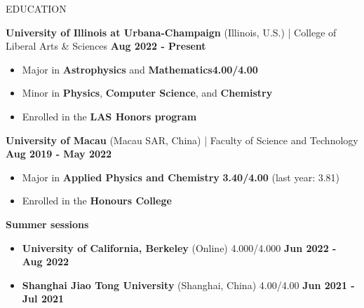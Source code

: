 \documentclass[11pt]{article}
\begin{document}

\begin{section}{EDUCATION}

\textbf{University of Illinois at Urbana-Champaign} (Illinois, U.S.) | College of Liberal Arts \& Sciences \hfill \textbf{Aug 2022 - Present}
\begin{itemize}[leftmargin=1.5em]
    \item Major in \textbf{Astrophysics} and \textbf{Mathematics}\hfill \textbf{4.00/4.00} 
    \item Minor in \textbf{Physics}, \textbf{Computer Science}, and \textbf{Chemistry}
    \item Enrolled in the \textbf{LAS Honors program} 
\end{itemize}

\textbf{University of Macau} (Macau SAR, China) | Faculty of Science and Technology \hfill \textbf{Aug 2019 - May 2022}
\begin{itemize}[leftmargin=1.5em]
    \item Major in \textbf{Applied Physics and Chemistry} \hfill \textbf{3.40/4.00} (last year: 3.81)
    \item Enrolled in the \textbf{Honours College}
\end{itemize}

\textbf{Summer sessions}
\begin{itemize}[leftmargin=1.5em]
    \item \textbf{University of California, Berkeley} (Online) \hfill 4.000/4.000  \textbf{Jun 2022 - Aug 2022} 
    \item \textbf{Shanghai Jiao Tong University} (Shanghai, China) \hfill 4.00/4.00  \textbf{Jun 2021 - Jul 2021}
\end{itemize}
    
\end{section}
\end{document}
